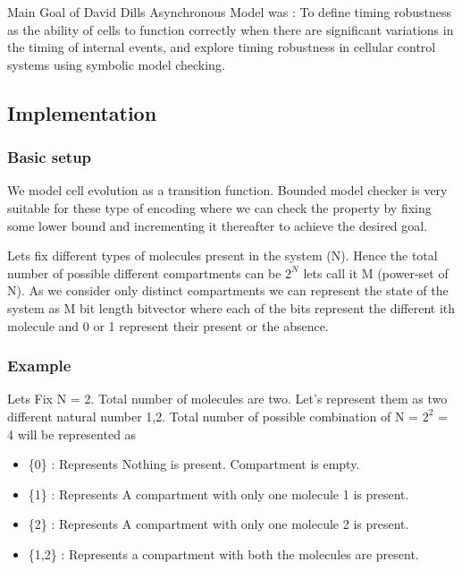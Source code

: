 \documentclass[preprint,12pt]{elsarticle}
\begin{document}
Main Goal of David Dills Asynchronous Model was : To define timing robustness as the ability of cells to function correctly when there are significant variations in the timing of internal events, and explore timing robustness in cellular control systems using symbolic model checking.

\subsection{Implementation}
\subsubsection{Basic setup}
We model cell evolution as a transition function. Bounded model checker is very suitable for these type of encoding where we can check the property by fixing some lower bound and incrementing it thereafter to achieve the desired goal.

Lets fix different types of molecules present in the system (N). Hence the total number of possible different compartments can be $2^{N}$ lets call it M (power-set of N). 
As we consider only distinct compartments we can represent the state of the system as M bit length bitvector where each of the bits represent the different ith molecule and 0 or 1 represent their present or the absence.

\subsubsection{Example}
Lets Fix N = 2. Total number of molecules are two. Let's represent them as two different natural number 1,2. Total number of possible combination of N = $2 ^ {2}$  = 4 will be represented as 
\begin{itemize}
\item \{0\} : Represents Nothing is present. Compartment is empty.  
\item \{1\} : Represents A compartment with only one molecule 1 is present.
\item \{2\} : Represents A compartment with only one molecule 2 is present. 
\item \{1,2\} : Represents a compartment with both the molecules are present.
\end{itemize}
\end{document}
